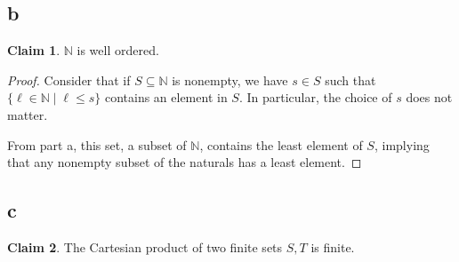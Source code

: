 \documentclass[12pt,letterpaper]{article}
\theoremstyle{definition}
\newtheorem*{claim}{Claim}
\newcommand{\N}{\mathbb{N}}
\begin{document}
\subsection*{b}

\begin{claim}
    $\N$ is well ordered.
\end{claim}

\begin{proof}
    Consider that if $S \subseteq \N$ is nonempty,
    we have $s \in S$ such that $\{\ell \in \N \mid \ell \leq s\}$ contains an element in $S$.
    In particular, the choice of $s$ does not matter.

    From part a, this set, a subset of $\N$, contains the least element of $S$, implying that any nonempty
    subset of the naturals has a least element.
\end{proof}

\subsection*{c}
\begin{claim}
    The Cartesian product of two finite sets $S,T$ is finite.
\end{claim}
\end{document}
